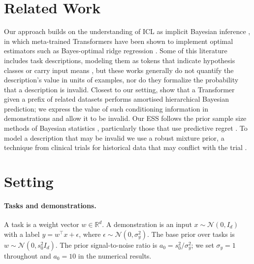 \documentclass[10pt]{article}
\newcommand{\R}{\mathbb{R}}
\begin{document}
\section{Related Work}
Our approach builds on the understanding of ICL as implicit Bayesian inference \citep{xie2022}, in which meta-trained Transformers have been shown to implement optimal estimators such as Bayes-optimal ridge regression \citep{akyurek2023, raventos2023, panwar2024}. Some of this literature includes task descriptions, modeling them as tokens that indicate hypothesis classes or carry input means \citep{huangge2025, lin2025, tong2026, lin2024}, but these works generally do not quantify the description's value in units of examples, nor do they formalize the probability that a description is invalid. Closest to our setting, \citet{zhu2026} show that a Transformer given a prefix of related datasets performs amortised hierarchical Bayesian prediction; we express the value of such conditioning information in demonstrations and allow it to be invalid. Our ESS follows the prior sample size methods of Bayesian statistics \citep{morita2008, reimherr2021, neuenschwander2020}, particularly those that use predictive regret \citep{reznik2026}. To model a description that may be invalid we use a robust mixture prior, a technique from clinical trials for historical data that may conflict with the trial \citep{schmidli2014}.

\section{Setting}\label{sec:setting}

\paragraph{Tasks and demonstrations.} A task is a weight vector $w \in \R^d$. A demonstration is an input $x \sim \mathcal{N}(0, I_d)$ with a label $y = w^\top x + \epsilon$, where $\epsilon \sim \mathcal{N}(0, \sigma_y^2)$. The base prior over tasks is $w \sim \mathcal{N}(0, s_0^2 I_d)$. The prior signal-to-noise ratio is $a_0 = s_0^2/\sigma_y^2$; we set $\sigma_y = 1$ throughout and $a_0 = 10$ in the numerical results.
\end{document}
